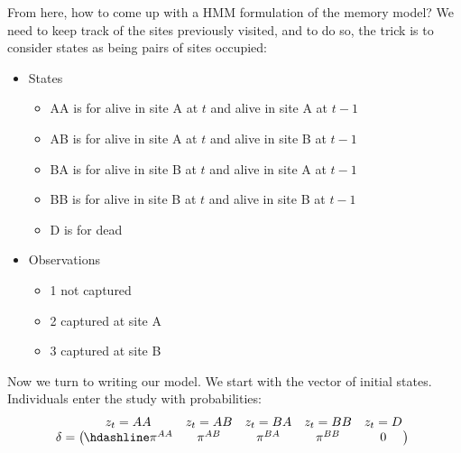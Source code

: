 \documentclass[
  12pt,
]{krantz}
\providecommand{\tightlist}{%
  \setlength{\itemsep}{0pt}\setlength{\parskip}{0pt}}
\begin{document}
From here, how to come up with a HMM formulation of the memory model? We need to keep track of the sites previously visited, and to do so, the trick is to consider states as being pairs of sites occupied:

\begin{itemize}
\tightlist
\item
  States

  \begin{itemize}
  \tightlist
  \item
    AA is for alive in site A at \(t\) and alive in site A at \(t-1\)\\
  \item
    AB is for alive in site A at \(t\) and alive in site B at \(t-1\)\\
  \item
    BA is for alive in site B at \(t\) and alive in site A at \(t-1\)\\
  \item
    BB is for alive in site B at \(t\) and alive in site B at \(t-1\)\\
  \item
    D is for dead
  \end{itemize}
\item
  Observations

  \begin{itemize}
  \tightlist
  \item
    1 not captured\\
  \item
    2 captured at site A\\
  \item
    3 captured at site B
  \end{itemize}
\end{itemize}

Now we turn to writing our model. We start with the vector of initial states. Individuals enter the study with probabilities:
\[\begin{matrix}
& \\
\mathbf{\delta} =
\left ( \vphantom{ \begin{matrix} 12 \end{matrix} } \right .
\end{matrix}
\hspace{-1.2em}
\begin{matrix}
z_t=AA & z_t=AB & z_t=BA & z_t=BB &z_t=D \\ \hdashline
\pi^{AA} & \pi^{AB} & \pi^{BA} & \pi^{BB} & 0\\
\end{matrix}
\hspace{-0.2em}
\begin{matrix}
& \\
\left . \vphantom{ \begin{matrix} 12 \end{matrix} } \right )
\begin{matrix}
\end{matrix}
\end{matrix}\]
\end{document}
